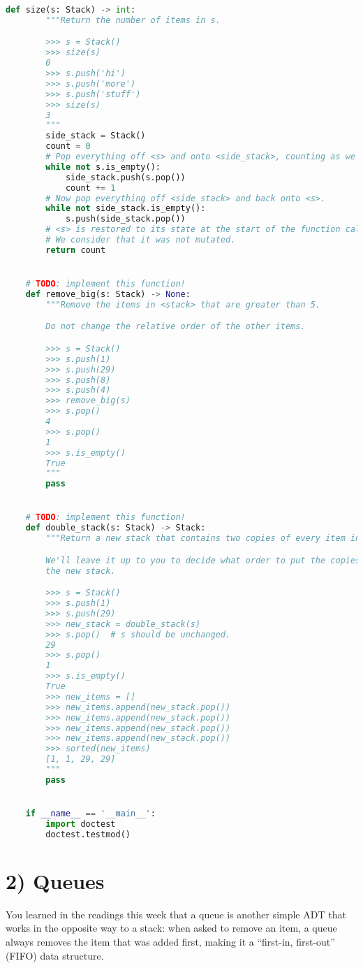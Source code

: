 \documentclass[12pt]{article}
\begin{document}
\begin{lstlisting}[language=Python,caption={mystack.py},captionpos=b]
    def size(s: Stack) -> int:
        """Return the number of items in s.

        >>> s = Stack()
        >>> size(s)
        0
        >>> s.push('hi')
        >>> s.push('more')
        >>> s.push('stuff')
        >>> size(s)
        3
        """
        side_stack = Stack()
        count = 0
        # Pop everything off <s> and onto <side_stack>, counting as we go.
        while not s.is_empty():
            side_stack.push(s.pop())
            count += 1
        # Now pop everything off <side_stack> and back onto <s>.
        while not side_stack.is_empty():
            s.push(side_stack.pop())
        # <s> is restored to its state at the start of the function call.
        # We consider that it was not mutated.
        return count


    # TODO: implement this function!
    def remove_big(s: Stack) -> None:
        """Remove the items in <stack> that are greater than 5.

        Do not change the relative order of the other items.

        >>> s = Stack()
        >>> s.push(1)
        >>> s.push(29)
        >>> s.push(8)
        >>> s.push(4)
        >>> remove_big(s)
        >>> s.pop()
        4
        >>> s.pop()
        1
        >>> s.is_empty()
        True
        """
        pass


    # TODO: implement this function!
    def double_stack(s: Stack) -> Stack:
        """Return a new stack that contains two copies of every item in <stack>.

        We'll leave it up to you to decide what order to put the copies into in
        the new stack.

        >>> s = Stack()
        >>> s.push(1)
        >>> s.push(29)
        >>> new_stack = double_stack(s)
        >>> s.pop()  # s should be unchanged.
        29
        >>> s.pop()
        1
        >>> s.is_empty()
        True
        >>> new_items = []
        >>> new_items.append(new_stack.pop())
        >>> new_items.append(new_stack.pop())
        >>> new_items.append(new_stack.pop())
        >>> new_items.append(new_stack.pop())
        >>> sorted(new_items)
        [1, 1, 29, 29]
        """
        pass


    if __name__ == '__main__':
        import doctest
        doctest.testmod()

\end{lstlisting}

\section*{2) Queues}
You learned in the readings this week that a queue is another simple ADT that works
in the opposite way to a stack: when asked to remove an item, a queue always removes
the item that was added first, making it a “first-in, first-out” (FIFO) data
structure.
\end{document}
